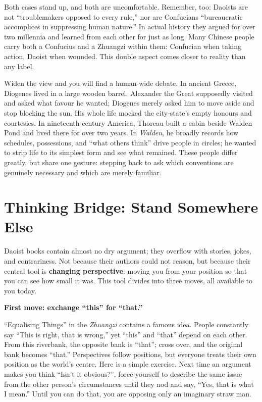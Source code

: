 Both cases stand up, and both are uncomfortable. Remember, too: Daoists are not ``troublemakers opposed to every rule,'' nor are Confucians ``bureaucratic accomplices in suppressing human nature.'' In actual history they argued for over two millennia and learned from each other for just as long. Many Chinese people carry both a Confucius and a Zhuangzi within them: Confucian when taking action, Daoist when wounded. This double aspect comes closer to reality than any label.

Widen the view and you will find a human-wide debate. In ancient Greece, Diogenes lived in a large wooden barrel. Alexander the Great supposedly visited and asked what favour he wanted; Diogenes merely asked him to move aside and stop blocking the sun. His whole life mocked the city-state's empty honours and courtesies. In nineteenth-century America, Thoreau built a cabin beside Walden Pond and lived there for over two years. In \textit{Walden}, he broadly records how schedules, possessions, and ``what others think'' drive people in circles; he wanted to strip life to its simplest form and see what remained. These people differ greatly, but share one gesture: stepping back to ask which conventions are genuinely necessary and which are merely familiar.

\section[Thinking Bridge: Change Your Position]{Thinking Bridge: Stand Somewhere Else}
Daoist books contain almost no dry argument; they overflow with stories, jokes, and contrariness. Not because their authors could not reason, but because their central tool is \textbf{changing perspective}: moving you from your position so that you can see how small it was. This tool divides into three moves, all available to you today.

\textbf{First move: exchange ``this'' for ``that.''}

``Equalising Things'' in the \textit{Zhuangzi} contains a famous idea. People constantly say ``This is right, that is wrong,'' yet ``this'' and ``that'' depend on each other. From this riverbank, the opposite bank is ``that''; cross over, and the original bank becomes ``that.'' Perspectives follow positions, but everyone treats their own position as the world's centre. Here is a simple exercise. Next time an argument makes you think ``Isn't it obvious?'', force yourself to describe the same issue from the other person's circumstances until they nod and say, ``Yes, that is what I mean.'' Until you can do that, you are opposing only an imaginary straw man.

